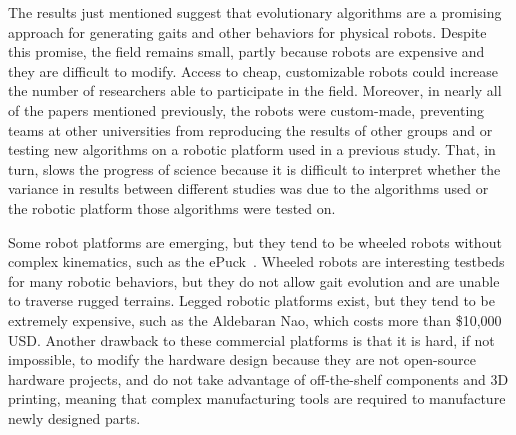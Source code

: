 \documentclass[letterpaper]{article}
\begin{document}


The results just mentioned suggest that evolutionary algorithms are a promising approach for generating gaits and other behaviors for physical robots. Despite this promise, the field remains small, partly because robots are expensive and they are difficult to modify. Access to cheap, customizable robots could increase the number of researchers able to participate in the field. Moreover, in nearly all of the papers mentioned previously, the robots were custom-made, preventing teams at other universities from reproducing the results of other groups and or testing new algorithms on a robotic platform used in a previous study. That, in turn, slows the progress of science because it is difficult to interpret whether the variance in results between different studies was due to the algorithms used or the robotic platform those algorithms were tested on.  

Some robot platforms are emerging, but they tend to be wheeled robots without complex kinematics, such as the ePuck~\citep{mondada2009puck}. Wheeled robots are interesting testbeds for many robotic behaviors, but they do not allow gait evolution and are unable to traverse rugged terrains. Legged robotic platforms exist, but they tend to be extremely expensive, such as the Aldebaran Nao, which costs more than \$10,000 USD. Another drawback to these commercial platforms is that it is hard, if not impossible, to modify the hardware design because they are not open-source hardware projects, and do not take advantage of off-the-shelf components and 3D printing, meaning that complex manufacturing tools are required to manufacture newly designed parts. 
\end{document}

